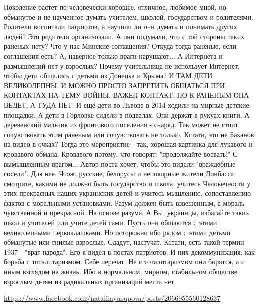 Поколение растет по человечески хорошее, отличное, любимое мной, но обманутое
и не наученное думать учителем, школой, государством и родителями. Родители
воспитали патриотов, а научили ли они думать  и понимать других людей? Это
родители организовали. А они подумали, что с той стороны таких раненых нету?
Что у нас Минские соглашения? Откуда тогда раненые,  если соглашения есть? А,
наверное только враги нарушают... А Интернета и размышлений нет у взрослых?
Почему учительница не использует Интернет, чтобы дети общались с детьми из
Донецка и Крыма? И ТАМ ДЕТИ ВЕЛИКОЛЕПНЫ. И МОЖНО ПРОСТО ЗАПРЕТИТЬ ОБЩАТЬСЯ ПРИ
КОНТАКТАХ НА ТЕМУ ВОЙНЫ. ВАЖЕН КОНТАКТ. НО К РАНЕНЫМ ОНА ВЕДЕТ, А ТУДА НЕТ. И
ещё дети во Львове в 2014 ходили на мирные детские площадки. А дети в Горловке
сидели в подвалах. Они держат в рукуах книги. А деревенский мальчик из
фронтового поселения -  снаряд. Так может не стоит сочувствовать этим раненым
или сочувствовать не только. Кстати, это не Баканов на видео в очках? Тогда
это мероприятие - так, хорошая картинка для лукавого и кровавого обмана.
Кровавого потому, что говорят: "продолжайте воевать!" С вымышленным врагом...
Автор поста хочет, чтобы это  видели "враждебные соседи". Для нее. Чтож,
русские, белорусы и непокорные жители Донбасса смотрите, какими не должно быть
государство и школа, учитесь Человечности у этих прекрасных наших украинских
детей и учитесь мышлению, сопоставлению фактов с моральными установками. Разум
должен быть взвешенным, а мораль чувственной и прекрасной. На основе разума. А
Вы, украинцы, избагайте таких школ и учителей или учите детей сами. Пусть они
общаются с этими великолепными первоклашками. Но осторожно ибо рядом с этими
детьми обманутые или гнилые взрослые. Сдадут, настучат. Кстати, есть такой
термин 1937 - "враг народа". Его я видел в постах патриотов. И них
декоммунизация, как борьба с тоталитаризмом.  Себе перечат. Не с
тоталитаризмом они борятся, а с иным взглядом на жизнь. Ибо в нормальном,
мирном, стабильном обществе взрослым детям из радикальных организаций места
нет.

\url{https://www.facebook.com/nataliiayusupova/posts/2066955560128637}

